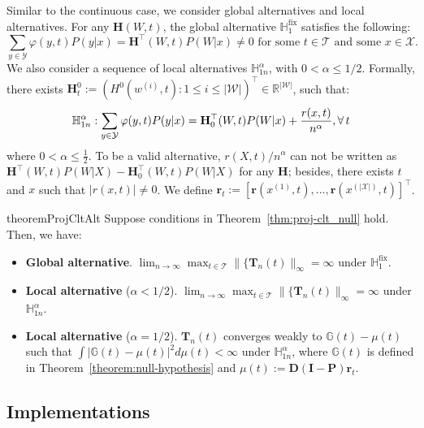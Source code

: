 \documentclass[
  12pt]{article}
\def\D{\mathbf{D}}
\def\H{\mathbf{H}}
\def\I{\mathbf{I}}
\def\P{\mathbf{P}}
\def\r{\mathbf{r}}
\def\T{\mathbf{T}}
\def\mH{\mathbb{H}}
\def\mR{\mathbb{R}}
\def\cT{\mathcal{T}}
\begin{document}
Similar to the continuous case, we consider global alternatives and local alternatives. For any $\H(W,t)$, the global alternative $\mH_1^{\mathrm{fix}}$ satisfies the following:
\begin{equation*}
\sum_{y\in\mathcal{Y}}\varphi(y,t)P(y|x)= \H^\top(W,t)P(W|x) \neq 0 \text{ for some $t \in \cT$ and some $x\in \mathcal{X}$}. 
\end{equation*}
We also consider a sequence of local alternatives $\mH^\alpha_{1n}$, with $0 < \alpha \leq 1/2$. Formally, there exists $\H^0_t := \left(H^0(w^{(i)}, t): 1 \leq i \leq |\mathcal{W}| \right)^\top \in \mR^{|\mathcal{W}|}$, such that: 
\begin{equation*}
    \mathbb H^\alpha_{1n}: \sum_{y\in\mathcal{Y}}\varphi(y,t)P(y|x)= \H_0^\top(W,t)P(W|x) + \frac{r(x,t)}{n^\alpha}, \forall \thinspace t
\end{equation*}
where $0 < \alpha \leq \frac{1}{2}$. To be a valid alternative, $r(X,t)/n^\alpha$ can not be written as $\H^\top(W,t)P(W|X) - \H_0^\top(W,t)P(W|X)$ for any $\H$; besides, there exists $t$ and $x$ such that $|r(x,t)| \neq 0$. We define $\r_t := [\r(x^{(1)},t), ..., \r(x^{(|\mathcal{X}|)},t)]^\top$. 
\begin{restatable}{theorem}{ProjCltAlt}
\label{thm:proj-clt_alt}
Suppose conditions in Theorem~\ref{thm:proj-clt_null} hold. Then, we have:
\begin{itemize}[noitemsep,topsep=0pt]
    \item[\textbf{\emph{(i)}}] \textbf{Global alternative}.  $\lim_{n\rightarrow \infty} \max_{t\in \cT} \|\{\T_n(t)\|_{\infty} =\infty$ under $\mH_1^{\mathrm{fix}}$. 
    \item[\textbf{\emph{(ii)}}] \textbf{Local alternative} ($\alpha < 1/2$). $\lim_{n\rightarrow \infty} \max_{t\in \cT} \|\{\T_n(t)\|_{\infty} =\infty$ under $\mH^\alpha_{1n}$. 
    \item[\textbf{\emph{(iii)}}] \textbf{Local alternative} ($\alpha = 1/2$). $\T_n(t)$ converges weakly to $\mathbb{G}(t)-\mu(t)$ such that $\int |\mathbb{G}(t)-\mu(t)|^2 d\mu(t) < \infty$ under $\mH^\alpha_{1n}$, where $\mathbb{G}(t)$ is defined in Theorem~\ref{theorem:null-hypothesis} and $\mu(t):=\D(\I-\P)\r_t$.
\end{itemize}
\end{restatable}





\subsection{Implementations}\label{sec.implement}
\end{document}
